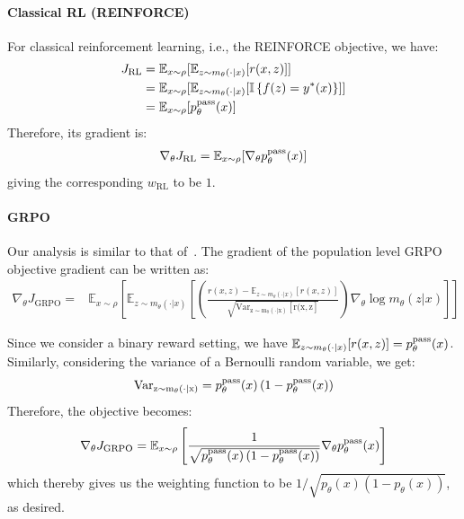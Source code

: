 \documentclass[10pt]{article} %
\begin{document}
\paragraph{Classical RL (REINFORCE)} For classical reinforcement learning, i.e., the REINFORCE objective, we have:
\begin{align*}
    J_\mathrm{RL} = {}  & \mathbb{E}_{x \sim \rho} [\mathbb{E}_{z \sim m_\theta(\cdot|x)} [r(x, z)]] \\
    = {} & \mathbb{E}_{x \sim \rho} [\mathbb{E}_{z \sim m_\theta(\cdot|x)} [\mathbb{I}\left\{ f(z) = y^\ast(x)\right\}]] \\
    = {} & \mathbb{E}_{x \sim \rho} [p^{\mathrm{pass}}_{\theta}(x)]
\end{align*}
Therefore, its gradient is:
\begin{align*}
    \nabla_\theta J_\mathrm{RL}  = \mathbb{E}_{x \sim \rho} [\nabla_\theta p^{\mathrm{pass}}_{\theta}(x)]
\end{align*}
giving the corresponding $w_\mathrm{RL}$ to be $1$.

\paragraph{GRPO} Our analysis is similar to that of~\citet{davis2025objectivereasoningreinforcementlearning}. The gradient of the population level GRPO objective gradient can be written as:
\begin{align*}
    \nabla_\theta J_\mathrm{GRPO} = {} & \mathbb{E}_{x \sim \rho} \left[ \mathbb{E}_{z \sim m_\theta(\cdot|x)} \left[ \left(\frac{r(x, z) - \mathbb{E}_{z \sim m_\theta(\cdot|x)}[r(x, z)]}{\sqrt{\mathrm{Var_{z \sim m_\theta(\cdot |x)} [r(x, z]}}}\right) \nabla_\theta \log m_\theta(z|x)\right] \right]
\end{align*}

Since we consider a binary reward setting, we have $\mathbb{E}_{z \sim m_\theta(\cdot|x)}[r(x, z)] = p^{\mathrm{pass}}_{\theta}(x)$. Similarly, considering the variance of a Bernoulli random variable, we get:
\begin{equation*}
    \mathrm{Var_{z \sim m_\theta(\cdot |x)}} = p^{\mathrm{pass}}_{\theta}(x) \left(1 - p^{\mathrm{pass}}_{\theta}(x)\right)
\end{equation*}
Therefore, the objective becomes:
\begin{equation*}
    \nabla_\theta J_\mathrm{GRPO} = \mathbb{E}_{x \sim \rho} \left[ \frac{1}{\sqrt{p^{\mathrm{pass}}_{\theta}(x) \left(1 - p^{\mathrm{pass}}_{\theta}(x)\right)}} \nabla_\theta p^{\mathrm{pass}}_{\theta}(x)\right]
\end{equation*}
which thereby gives us the weighting function to be $1/\sqrt{p_\theta(x)(1 - p_\theta(x))}$, as desired.
\end{document}
